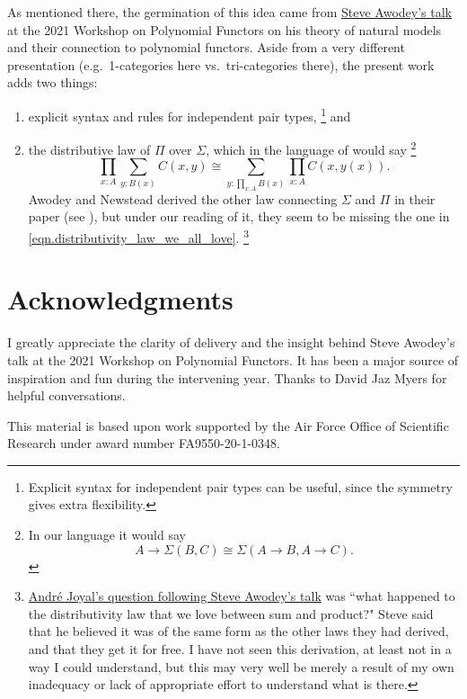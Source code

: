 \documentclass[11pt, one side, article]{memoir}
\theoremstyle{definition}
\theoremstyle{plain}
\newcommand{\0}{\textsf{0}}
\newcommand{\1}{\tn{\textsf{1}}}
\begin{document}
As mentioned there, the germination of this idea came from \href{https://www.youtube.com/watch?v=RDuNIP4icKI\&t=10765s}{Steve Awodey's talk} at the 2021 Workshop on Polynomial Functors on his theory of natural models and their connection to polynomial functors. Aside from a very different presentation (e.g.\ 1-categories here vs.\ tri-categories there), the present work adds two things:
\begin{enumerate}
	\item explicit syntax and rules for independent pair types,%
	\footnote{Explicit syntax for independent pair types can be useful, since the symmetry gives extra flexibility.}
	 and
	\item the distributive law of $\Pi$ over $\Sigma$, which in the language of \cite{awodey2018polynomial} would say%
	\footnote{In our language it would say 
	\[
	A\to\Sigma(B,C)\cong \Sigma(A\to B,A\to C).
	\]
	}
	\begin{equation}\label{eqn.distributivity_law_we_all_love}
	\prod_{x:A}\sum_{y:B(x)}C(x,y)\cong\sum_{y:\prod_{x:A}B(x)}\prod_{x:A}C(x,y(x)).
	\end{equation}
	Awodey and Newstead derived the other law connecting $\Sigma$ and $\Pi$ in their paper (see \cite[Remark 4.2]{awodey2018polynomial}), but under our reading of it, they seem to be missing the one in \eqref{eqn.distributivity_law_we_all_love}.%
	\footnote{\href{https://youtu.be/RDuNIP4icKI?t=13898}{Andr\'{e} Joyal's question following Steve Awodey's talk} was ``what happened to the distributivity law that we love between sum and product?" Steve said that he believed it was of the same form as the other laws they had derived, and that they get it for free. I have not seen this derivation, at least not in a way I could understand, but this may very well be merely a result of my own inadequacy or lack of appropriate effort to understand what is there.}
\end{enumerate}

\section{Acknowledgments}

I greatly appreciate the clarity of delivery and the insight behind Steve Awodey's talk at the 2021 Workshop on Polynomial Functors. It has been a major source of inspiration and fun during the intervening year. Thanks to David Jaz Myers for helpful conversations. 

This material is based upon work supported by the Air Force Office of Scientific Research under award number FA9550-20-1-0348.
\end{document}
